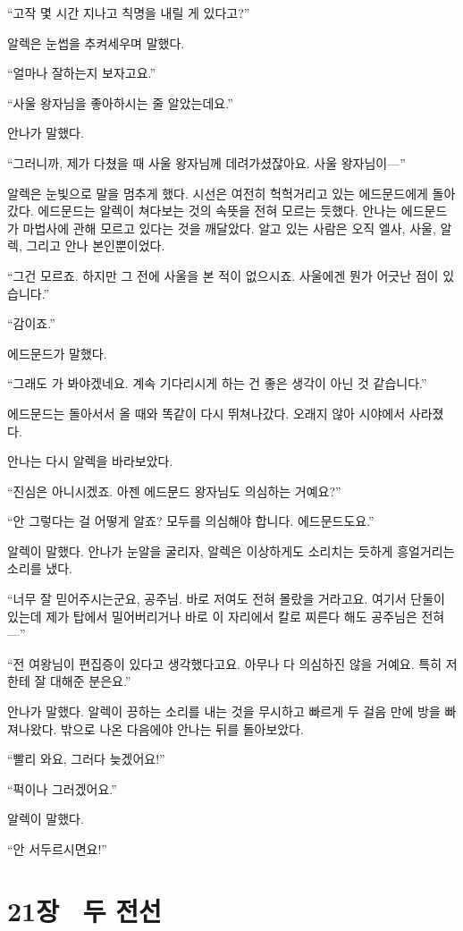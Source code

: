 ``고작 몇 시간 지나고 칙명을 내릴 게 있다고?''

알렉은 눈썹을 추켜세우며 말했다.

``얼마나 잘하는지 보자고요.''

``사울 왕자님을 좋아하시는 줄 알았는데요.''

안나가 말했다.

``그러니까, 제가 다쳤을 때 사울 왕자님께 데려가셨잖아요. 사울 왕자님이—''

알렉은 눈빛으로 말을 멈추게 했다. 시선은 여전히 헉헉거리고 있는 에드문드에게 돌아갔다. 에드문드는 알렉이 쳐다보는 것의 속뜻을 전혀 모르는 듯했다. 안나는 에드문드가 마법사에 관해 모르고 있다는 것을 깨달았다. 알고 있는 사람은 오직 엘사, 사울, 알렉, 그리고 안나 본인뿐이었다.

``그건 모르죠. 하지만 그 전에 사울을 본 적이 없으시죠. 사울에겐 뭔가 어긋난 점이 있습니다.''

``감이죠.''

에드문드가 말했다.

``그래도 가 봐야겠네요. 계속 기다리시게 하는 건 좋은 생각이 아닌 것 같습니다.''

에드문드는 돌아서서 올 때와 똑같이 다시 뛰쳐나갔다. 오래지 않아 시야에서 사라졌다.

안나는 다시 알렉을 바라보았다.

``진심은 아니시겠죠. 아젠 에드문드 왕자님도 의심하는 거예요?''

``안 그렇다는 걸 어떻게 알죠? 모두를 의심해야 합니다. 에드문드도요.''

알렉이 말했다. 안나가 눈알을 굴리자, 알렉은 이상하게도 소리치는 듯하게 흥얼거리는 소리를 냈다.

``너무 잘 믿어주시는군요, 공주님. 바로 저여도 전혀 몰랐을 거라고요. 여기서 단둘이 있는데 제가 탑에서 밀어버리거나 바로 이 자리에서 칼로 찌른다 해도 공주님은 전혀—''

``전 여왕님이 편집증이 있다고 생각했다고요. 아무나 다 의심하진 않을 거예요. 특히 저한테 잘 대해준 분은요.''

안나가 말했다. 알렉이 끙하는 소리를 내는 것을 무시하고 빠르게 두 걸음 만에 방을 빠져나왔다. 밖으로 나온 다음에야 안나는 뒤를 돌아보았다.

``빨리 와요, 그러다 늦겠어요!''

``퍽이나 그러겠어요.''

알렉이 말했다.

``안 서두르시면요!''



\chapter[21장  두 전선][21장\hspace*{.5em}두 전선]{21장 \ 두 전선}



